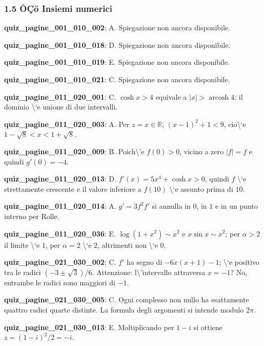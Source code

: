 \documentclass[11pt,a4paper]{article}
\newcounter{quiz}
\begin{document}
\subsubsection*{1.5 ÔÇö Insiemi numerici}
\noindent\textbf{quiz\_pagine\_001\_010\_002}: A. Spiegazione non ancora disponibile.\par\medskip
\noindent\textbf{quiz\_pagine\_001\_010\_018}: D. Spiegazione non ancora disponibile.\par\medskip
\noindent\textbf{quiz\_pagine\_001\_010\_019}: E. Spiegazione non ancora disponibile.\par\medskip
\noindent\textbf{quiz\_pagine\_001\_010\_021}: C. Spiegazione non ancora disponibile.\par\medskip
\noindent\textbf{quiz\_pagine\_011\_020\_001}: C. $\cosh x>4$ equivale a $|x|>\operatorname{arcosh}4$: il dominio \textbackslash{}`e unione di due intervalli.\par\medskip
\noindent\textbf{quiz\_pagine\_011\_020\_003}: A. Per $z=x\in\mathbb R$, $(x-1)^2+1<9$, cio\textbackslash{}`e $1-\sqrt8<x<1+\sqrt8$.\par\medskip
\noindent\textbf{quiz\_pagine\_011\_020\_009}: B. Poich\textbackslash{}'e $f(0)>0$, vicino a zero $|f|=f$ e quindi $g\prime(0)=-4$.\par\medskip
\noindent\textbf{quiz\_pagine\_011\_020\_013}: D. $f\prime(x)=5x^4+\cosh x>0$, quindi $f$ \textbackslash{}`e strettamente crescente e il valore inferiore a $f(10)$ \textbackslash{}`e assunto prima di $10$.\par\medskip
\noindent\textbf{quiz\_pagine\_011\_020\_014}: A. $g\prime=3f^2f\prime$ si annulla in $0$, in $1$ e in un punto interno per Rolle.\par\medskip
\noindent\textbf{quiz\_pagine\_011\_020\_036}: E. $\log(1+x^2)\sim x^2$ e $x\sin x\sim x^2$; per $\alpha>2$ il limite \textbackslash{}`e $1$, per $\alpha=2$ \textbackslash{}`e $2$, altrimenti non \textbackslash{}`e $0$.\par\medskip
\noindent\textbf{quiz\_pagine\_021\_030\_002}: C. $f\prime$ ha segno di $-6x(x+1)-1$; \textbackslash{}`e positivo tra le radici $(-3\pm\sqrt3)/6$. Attenzione: l\textbackslash{}'intervallo attraversa $x=-1$? No, entrambe le radici sono maggiori di $-1$.\par\medskip
\noindent\textbf{quiz\_pagine\_021\_030\_005}: C. Ogni complesso non nullo ha esattamente quattro radici quarte distinte. La formula degli argomenti si intende modulo $2\pi$.\par\medskip
\noindent\textbf{quiz\_pagine\_021\_030\_013}: E. Moltiplicando per $1-i$ si ottiene $z=(1-i)^2/2=-i$.\par\medskip
\end{document}

